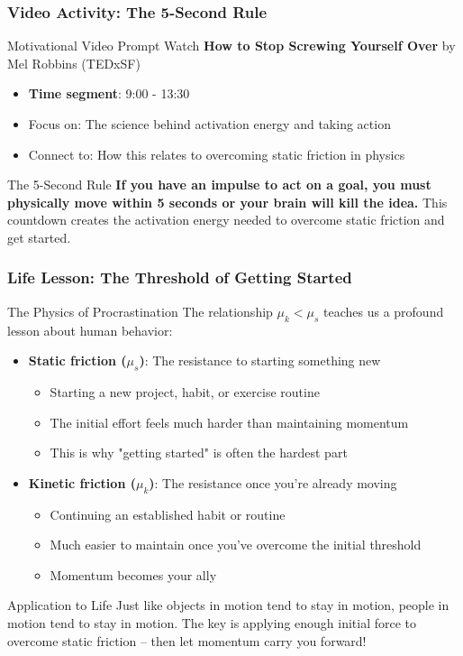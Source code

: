 \documentclass{beamer}
\begin{document}
\begin{frame}
\frametitle{Video Activity: The 5-Second Rule}
\begin{alertblock}{Motivational Video Prompt}
Watch \textbf{How to Stop Screwing Yourself Over} by Mel Robbins (TEDxSF)
\begin{itemize}
    \item \textbf{Time segment}: 9:00 - 13:30
    \item Focus on: The science behind activation energy and taking action
    \item Connect to: How this relates to overcoming static friction in physics
\end{itemize}
\end{alertblock}

\begin{exampleblock}{The 5-Second Rule}
\textbf{If you have an impulse to act on a goal, you must physically move within 5 seconds or your brain will kill the idea.} This countdown creates the activation energy needed to overcome static friction and get started.
\end{exampleblock}

\end{frame}

\begin{frame}
\frametitle{Life Lesson: The Threshold of Getting Started}
\begin{alertblock}{The Physics of Procrastination}
The relationship $\mu_k < \mu_s$ teaches us a profound lesson about human behavior:
\begin{itemize}
    \item \textbf{Static friction ($\mu_s$)}: The resistance to starting something new
    \begin{itemize}
        \item Starting a new project, habit, or exercise routine
        \item The initial effort feels much harder than maintaining momentum
        \item This is why "getting started" is often the hardest part
    \end{itemize} \pause
    \item \textbf{Kinetic friction ($\mu_k$)}: The resistance once you're already moving
    \begin{itemize}
        \item Continuing an established habit or routine
        \item Much easier to maintain once you've overcome the initial threshold
        \item Momentum becomes your ally
    \end{itemize}
\end{itemize}
\end{alertblock} \pause

\begin{exampleblock}{Application to Life}
Just like objects in motion tend to stay in motion, people in motion tend to stay in motion. The key is applying enough initial force to overcome static friction -- then let momentum carry you forward!
\end{exampleblock}
\end{frame}
\end{document}
